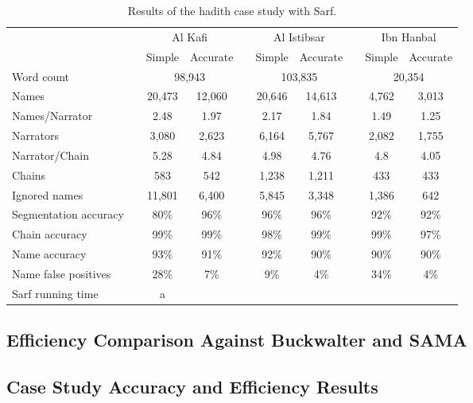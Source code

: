 \documentclass[11pt,letterpaper]{article}
\begin{document}
\begin{table*}[bt]
\centering
\caption{Results of the hadith case study with Sarf.}
\begin{tabular}{lp{.2cm}ccp{.2cm}ccp{.2cm}cc} %
 & & \multicolumn{2}{c}{Al Kafi} & & \multicolumn{2}{c}{Al Istibsar} & &\multicolumn{2}{c}{Ibn Hanbal} \\ 
 & & Simple & Accurate & & Simple & Accurate & & Simple  & Accurate \\ \hline \hline
Word count & &\multicolumn{2}{c}{98,943} & & \multicolumn{2}{c}{103,835} & & \multicolumn{2}{c}{20,354} \\ 
 Names      & & 20,473 & 12,060  & &20,646 &  14,613& & 4,762 & 3,013\\
Names/Narrator& &2.48 & 1.97 & & 2.17 &  1.84& & 1.49 & 1.25 \\
Narrators & &3,080 & 2,623 & & 6,164 &  5,767& & 2,082 & 1,755 \\ 
Narrator/Chain & & 5.28 & 4.84 & & 4.98&  4.76 & & 4.8 &4.05 \\
Chains & & 583 & 542 &  & 1,238& 1,211& & 433 & 433 \\ 
Ignored names & & 11,801 & 6,400 &  & 5,845 & 3,348 & & 1,386 & 642 \\ \hline \hline
Segmentation accuracy & & 80\% & 96\%& & 96\%& 96\%& & 92\%& 92\%\\ 
Chain accuracy & & 99\% & 99\%&  & 98\%& 99\%& & 99\% & 97\% \\ 
Name accuracy & & 93\% & 91\%& &  92\%& 90\% & & 90\% & 90\% \\ \hline
Name false positives & & 28\% & 7\%&  & 9\%& 4\% & & 34\% & 4\% \\ \hline
Sarf running time & &a & & & & & & & \\ \hline
\end{tabular}
\normalsize
\label{t:hadithresallresults}
\end{table*}

\subsection{Efficiency Comparison Against Buckwalter and SAMA}

\subsection{Case Study Accuracy and Efficiency Results}
\end{document}

